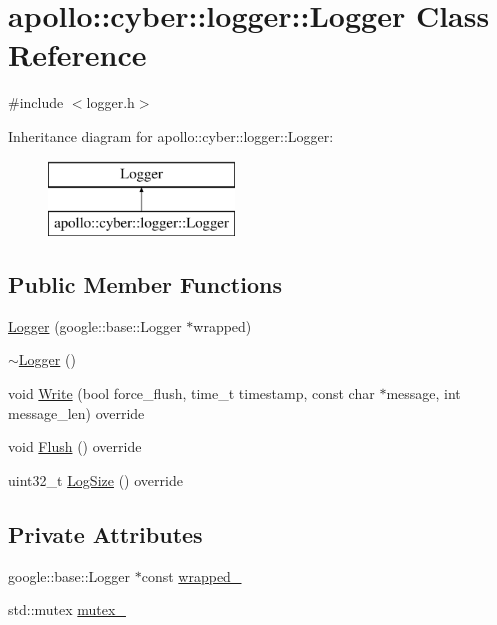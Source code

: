 \hypertarget{classapollo_1_1cyber_1_1logger_1_1Logger}{\section{apollo\-:\-:cyber\-:\-:logger\-:\-:Logger Class Reference}
\label{classapollo_1_1cyber_1_1logger_1_1Logger}
}


{\ttfamily \#include $<$logger.\-h$>$}

Inheritance diagram for apollo\-:\-:cyber\-:\-:logger\-:\-:Logger\-:\begin{figure}[H]
\begin{center}
\leavevmode
\includegraphics[height=2.000000cm]{classapollo_1_1cyber_1_1logger_1_1Logger}
\end{center}
\end{figure}
\subsection*{Public Member Functions}
\begin{DoxyCompactItemize}
\item 
\hyperlink{classapollo_1_1cyber_1_1logger_1_1Logger_ae66fdd9a20171e47e9e2074aa0880a4d}{Logger} (google\-::base\-::\-Logger $\ast$wrapped)
\item 
\hyperlink{classapollo_1_1cyber_1_1logger_1_1Logger_a7238886d763068ac235125dbea29189b}{$\sim$\-Logger} ()
\item 
void \hyperlink{classapollo_1_1cyber_1_1logger_1_1Logger_a714b49458650913f6eadf078f93aabd1}{Write} (bool force\-\_\-flush, time\-\_\-t timestamp, const char $\ast$message, int message\-\_\-len) override
\item 
void \hyperlink{classapollo_1_1cyber_1_1logger_1_1Logger_a7cc4e4b73f4c974022e38982b8567ed3}{Flush} () override
\item 
uint32\-\_\-t \hyperlink{classapollo_1_1cyber_1_1logger_1_1Logger_a3f4323607c447f93b01f84c9a4c22113}{Log\-Size} () override
\end{DoxyCompactItemize}
\subsection*{Private Attributes}
\begin{DoxyCompactItemize}
\item 
google\-::base\-::\-Logger $\ast$const \hyperlink{classapollo_1_1cyber_1_1logger_1_1Logger_a80db29c400adaba27edbe8a1aec55f90}{wrapped\-\_\-}
\item 
std\-::mutex \hyperlink{classapollo_1_1cyber_1_1logger_1_1Logger_a127c753b55ea9542c8b88882fd4c0b2e}{mutex\-\_\-}
\end{DoxyCompactItemize}


